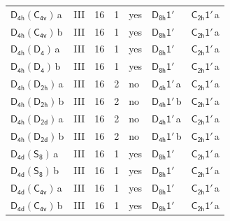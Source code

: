 \documentclass[10pt,a4paper]{article}
\numberwithin{equation}{section}
\newcommand{\grp}[1]{\mathsf{#1}}
\newcommand{\clsletter}[1]{\,{\scriptsize\color{black!55}#1}}
\begin{document}
{\begin{longtable}{@{}llrrlll@{}}
\href{D4h-C4v.pdf}{$\grp{D_{4h}}(\grp{C_{4v}})$}\clsletter{a} & III & 16 & 1 & yes & \href{D8h-1p.pdf}{$\grp{D_{8h}1'}$} & \href{C2h-1p.pdf}{$\grp{C_{2h}1'}$}\clsletter{a}\\
\href{D4h-C4v.pdf}{$\grp{D_{4h}}(\grp{C_{4v}})$}\clsletter{b} & III & 16 & 1 & yes & \href{D8h-1p.pdf}{$\grp{D_{8h}1'}$} & \href{C2h-1p.pdf}{$\grp{C_{2h}1'}$}\clsletter{a}\\
\href{D4h-D4.pdf}{$\grp{D_{4h}}(\grp{D_{4}})$}\clsletter{a} & III & 16 & 1 & yes & \href{D8h-1p.pdf}{$\grp{D_{8h}1'}$} & \href{C2h-1p.pdf}{$\grp{C_{2h}1'}$}\clsletter{a}\\
\href{D4h-D4.pdf}{$\grp{D_{4h}}(\grp{D_{4}})$}\clsletter{b} & III & 16 & 1 & yes & \href{D8h-1p.pdf}{$\grp{D_{8h}1'}$} & \href{C2h-1p.pdf}{$\grp{C_{2h}1'}$}\clsletter{a}\\
\href{D4h-D2h.pdf}{$\grp{D_{4h}}(\grp{D_{2h}})$}\clsletter{a} & III & 16 & 2 & no & \href{D4h-1p.pdf}{$\grp{D_{4h}1'}$}\clsletter{a} & \href{C2h-1p.pdf}{$\grp{C_{2h}1'}$}\clsletter{a}\\
\href{D4h-D2h.pdf}{$\grp{D_{4h}}(\grp{D_{2h}})$}\clsletter{b} & III & 16 & 2 & no & \href{D4h-1p.pdf}{$\grp{D_{4h}1'}$}\clsletter{b} & \href{C2h-1p.pdf}{$\grp{C_{2h}1'}$}\clsletter{a}\\
\href{D4h-D2d.pdf}{$\grp{D_{4h}}(\grp{D_{2d}})$}\clsletter{a} & III & 16 & 2 & no & \href{D4h-1p.pdf}{$\grp{D_{4h}1'}$}\clsletter{a} & \href{C2h-1p.pdf}{$\grp{C_{2h}1'}$}\clsletter{a}\\
\href{D4h-D2d.pdf}{$\grp{D_{4h}}(\grp{D_{2d}})$}\clsletter{b} & III & 16 & 2 & no & \href{D4h-1p.pdf}{$\grp{D_{4h}1'}$}\clsletter{b} & \href{C2h-1p.pdf}{$\grp{C_{2h}1'}$}\clsletter{a}\\
\href{D4d-S8.pdf}{$\grp{D_{4d}}(\grp{S_{8}})$}\clsletter{a} & III & 16 & 1 & yes & \href{D8h-1p.pdf}{$\grp{D_{8h}1'}$} & \href{C2h-1p.pdf}{$\grp{C_{2h}1'}$}\clsletter{a}\\
\href{D4d-S8.pdf}{$\grp{D_{4d}}(\grp{S_{8}})$}\clsletter{b} & III & 16 & 1 & yes & \href{D8h-1p.pdf}{$\grp{D_{8h}1'}$} & \href{C2h-1p.pdf}{$\grp{C_{2h}1'}$}\clsletter{a}\\
\href{D4d-C4v.pdf}{$\grp{D_{4d}}(\grp{C_{4v}})$}\clsletter{a} & III & 16 & 1 & yes & \href{D8h-1p.pdf}{$\grp{D_{8h}1'}$} & \href{C2h-1p.pdf}{$\grp{C_{2h}1'}$}\clsletter{a}\\
\href{D4d-C4v.pdf}{$\grp{D_{4d}}(\grp{C_{4v}})$}\clsletter{b} & III & 16 & 1 & yes & \href{D8h-1p.pdf}{$\grp{D_{8h}1'}$} & \href{C2h-1p.pdf}{$\grp{C_{2h}1'}$}\clsletter{a}\\

\end{longtable}}
\end{document}
